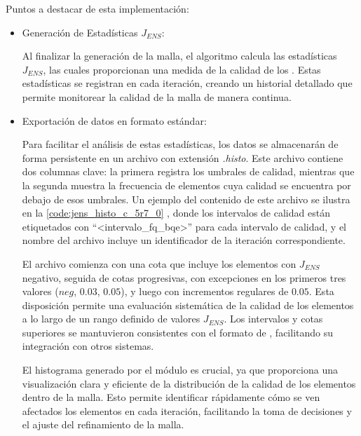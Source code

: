 Puntos a destacar de esta implementación:
    
\begin{itemize}
    \item  Generación de Estadísticas $J_{ENS}$:

	Al finalizar la generación de la malla, el algoritmo calcula las estadísticas $J_{ENS}$, las cuales proporcionan una medida de la calidad de los \elements{}. Estas estadísticas se registran en cada iteración, creando un historial detallado que permite monitorear la calidad de la malla de manera continua.
	
	\item Exportación de datos en formato estándar:
	
	Para facilitar el análisis de estas estadísticas, los datos se almacenarán de forma persistente en un archivo con extensión \textit{.histo}. Este archivo contiene dos columnas clave: la primera registra los umbrales de calidad, mientras que la segunda muestra la frecuencia de elementos cuya calidad se encuentra por debajo de esos umbrales. Un ejemplo del contenido de este archivo se ilustra en la \autoref{code:jens_histo_c_5r7_0} , donde los intervalos de calidad están etiquetados con ``<intervalo\_fq\_bqe>'' para cada intervalo de calidad, y el nombre del archivo incluye un identificador de la iteración correspondiente.
	
	El archivo comienza con una cota que incluye los elementos con $J_{ENS}$ negativo, seguida de cotas progresivas, con excepciones en los primeros tres valores ($neg$, $0.03$, $0.05$), y luego con incrementos regulares de $0.05$. Esta disposición permite una evaluación sistemática de la calidad de los elementos a lo largo de un rango definido de valores $J_{ENS}$. Los intervalos y cotas superiores se mantuvieron consistentes con el formato de \jens{}, facilitando su integración con otros sistemas.
	
	El histograma generado por el módulo \jens{} es crucial, ya que proporciona una visualización clara y eficiente de la distribución de la calidad de los elementos dentro de la malla. Esto permite identificar rápidamente cómo se ven afectados los elementos en cada iteración, facilitando la toma de decisiones y el ajuste del refinamiento de la malla.
	    

\end{itemize}
